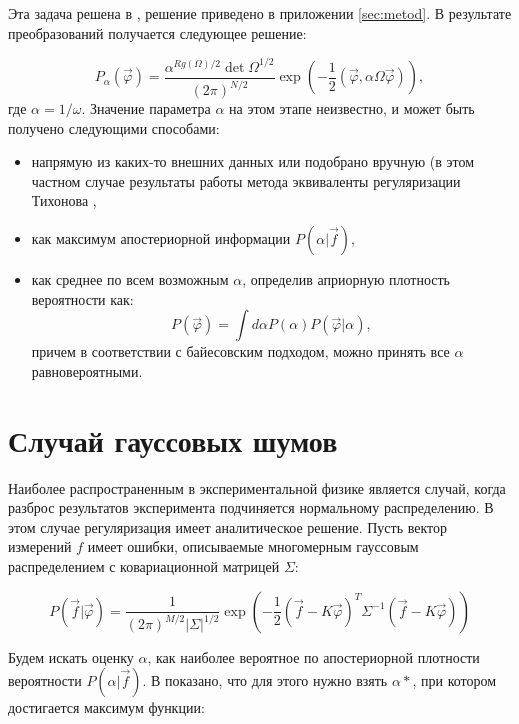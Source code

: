 Эта задача решена в \cite{turchin}, решение приведено в приложении \ref{sec:metod}. В результате преобразований получается следующее решение:

\begin{equation}
	\label{eq:apriori}
	P_{\alpha}(\vec{\varphi})  = \frac{\alpha^{Rg(\Omega)/2}\det\Omega^{1/2}}{(2\pi)^{N/2}} \exp(-\frac{1}{2} (\vec{\varphi},\alpha\Omega\vec{\varphi})),
\end{equation}
где $\alpha = 1/\omega$. 
Значение параметра $\alpha$ на этом этапе неизвестно, и может быть получено следующими способами:

\begin{itemize}
	\item напрямую из каких-то внешних данных или подобрано вручную (в этом частном случае результаты работы метода эквиваленты регуляризации Тихонова \cite{tihonov},
	\item как максимум апостериорной информации $P(\alpha|\vec{f})$,
	\item как среднее по всем возможным $\alpha$, определив априорную плотность вероятности как:
		\begin{equation}
			P(\vec{\varphi}) = \int d\alpha P(\alpha) P(\vec{\varphi}|\alpha),
		\end{equation}
		причем в соответствии с байесовским подходом, можно принять все $\alpha$ равновероятными.
\end{itemize}

\section{Случай гауссовых шумов}

Наиболее распространенным в экспериментальной физике является случай, когда разброс результатов эксперимента подчиняется нормальному распределению. В этом случае регуляризация имеет аналитическое решение.
Пусть вектор измерений $f$ имеет ошибки, описываемые многомерным гауссовым распределением с ковариационной матрицей $\Sigma$:

\begin{equation}
	P(\vec{f}|\vec{\varphi}) = \frac{1}{(2\pi)^{M/2}|\Sigma|^{1/2}} \exp(-\frac{1}{2}(\vec{f} - K\vec{\varphi})^T\Sigma^{-1}(\vec{f} - K\vec{\varphi}))
	\label{eq:gaussP}
\end{equation}

Будем искать оценку $\alpha$, как наиболее вероятное по апостериорной плотности вероятности $P(\alpha|\vec{f})$. В \cite{turchin} показано, что для этого нужно взять $\alpha*$, при котором достигается максимум функции: 

